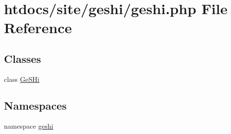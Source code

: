 \hypertarget{geshi_8php}{\section{htdocs/site/geshi/geshi.php File Reference}
\label{geshi_8php}
}
\subsection*{Classes}
\begin{DoxyCompactItemize}
\item 
class \hyperlink{class_ge_s_hi}{Ge\-S\-Hi}
\end{DoxyCompactItemize}
\subsection*{Namespaces}
\begin{DoxyCompactItemize}
\item 
namespace \hyperlink{namespacegeshi}{geshi}
\end{DoxyCompactItemize}
